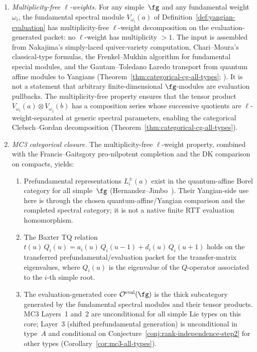 \begin{theorem}
\begin{enumerate}[label=\textup{(\roman*)}]
\item \emph{Multiplicity-free $\ell$-weights.}
 For any simple~$\fg$ and any fundamental weight~$\omega_i$, the
 fundamental spectral module $V_{\omega_i}(a)$ of
 Definition~\ref{def:yangian-evaluation} has multiplicity-free
 $\ell$-weight decomposition on the evaluation-generated packet:
 no $\ell$-weight has multiplicity $>1$.  The input is assembled
 from Nakajima's simply-laced quiver-variety computation,
 Chari--Moura's classical-type formulas, the Frenkel--Mukhin
 algorithm for fundamental special modules, and the
 Gautam--Toledano Laredo transport from quantum affine modules to
 Yangians
 \textup{(}Theorem~\textup{\ref{thm:categorical-cg-all-types}};
 \cite{Nakajima04,ChariMoura06,FrenkelMukhin01,GTL17}\textup{)}.
 It is not a statement that arbitrary finite-dimensional
 $\fg$-modules are evaluation pullbacks.  The multiplicity-free
 property ensures that the tensor product
 $V_{\omega_i}(a) \otimes V_{\omega_j}(b)$
 has a composition series whose successive quotients are
 $\ell$-weight-separated at generic spectral parameters, enabling
 the categorical Clebsch--Gordan decomposition
 \textup{(}Theorem~\textup{\ref{thm:categorical-cg-all-types}}\textup{)}.

\item \emph{MC3 categorical closure.}
 The multiplicity-free $\ell$-weight property, combined with the
 Francis--Gaitsgory pro-nilpotent completion and the DK comparison
 on compacts, yields:
 \begin{enumerate}[label=\textup{(\alph*)}]
 \item Prefundamental representations $L_i^\pm(a)$ exist in the
 quantum-affine Borel category for all simple~$\fg$
 \textup{(}Hernandez--Jimbo~\cite{HJ12}\textup{)}.  Their
 Yangian-side use here is through the chosen
 quantum-affine/Yangian comparison and the completed
 spectral category; it is not a native finite RTT evaluation
 homomorphism.
 \item The Baxter TQ relation
 $t(u)\, Q_i(u) = a_i(u)\, Q_i(u - 1) + d_i(u)\, Q_i(u + 1)$
 holds on the transferred prefundamental/evaluation packet for the
 transfer-matrix eigenvalues, where
 $Q_i(u)$ is the eigenvalue of the $Q$-operator associated
 to the $i$-th simple root.
 \item The evaluation-generated core
 $\mathcal{O}^{\mathrm{eval}}(\fg)$
 is the thick subcategory generated by the fundamental spectral
 modules and their tensor products. MC3 Layers~1 and~2 are
 unconditional for all simple Lie types on this core; Layer~3
 \textup{(}shifted prefundamental generation\textup{)} is
 unconditional in type~$A$ and conditional on
 Conjecture~\textup{\ref{conj:rank-independence-step2}}
 for other types
 \textup{(}Corollary~\textup{\ref{cor:mc3-all-types}}\textup{)}.

 \end{enumerate}
\end{enumerate}
\end{theorem}

